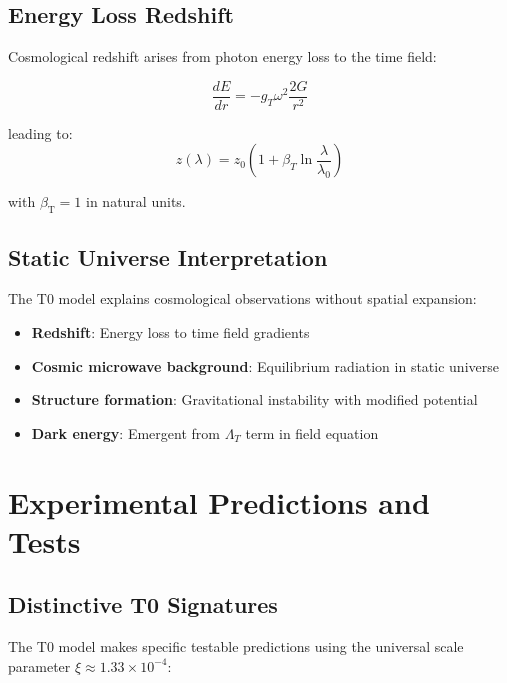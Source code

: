 \documentclass[12pt,a4paper]{article}
\newcommand{\betaT}{\beta_{\text{T}}}
\theoremstyle{definition}
\theoremstyle{remark}
\begin{document}
	\subsection{Energy Loss Redshift}
	\label{subsec:energy_loss_redshift}
	
	Cosmological redshift arises from photon energy loss to the time field:
	
	\begin{equation}
		\frac{dE}{dr} = -g_T \omega^2 \frac{2G}{r^2}
		\label{eq:energy_loss_rate}
	\end{equation}
	
	leading to:
	\begin{equation}
		z(\lambda) = z_0\left(1 + \beta_T \ln\frac{\lambda}{\lambda_0}\right)
		\label{eq:wavelength_dependent_redshift}
	\end{equation}
	
	with $\betaT = 1$ in natural units.
	
	\subsection{Static Universe Interpretation}
	\label{subsec:static_universe}
	
	The T0 model explains cosmological observations without spatial expansion:
	\begin{itemize}
		\item \textbf{Redshift}: Energy loss to time field gradients
		\item \textbf{Cosmic microwave background}: Equilibrium radiation in static universe
		\item \textbf{Structure formation}: Gravitational instability with modified potential
		\item \textbf{Dark energy}: Emergent from $\Lambda_T$ term in field equation
	\end{itemize}
	
	\section{Experimental Predictions and Tests}
	\label{sec:experimental_predictions}
	
	\subsection{Distinctive T0 Signatures}
	\label{subsec:distinctive_signatures}
	
	The T0 model makes specific testable predictions using the universal scale parameter $\xi \approx 1.33 \times 10^{-4}$:
	
\end{document}
